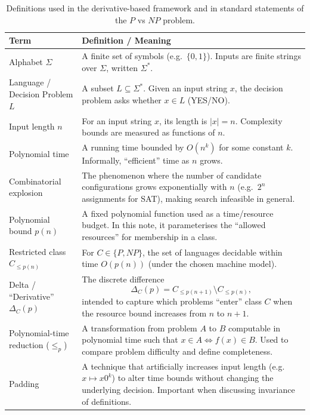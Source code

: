 \documentclass{article}
\begin{document}
\begin{table}[H]
\centering
\renewcommand{\arraystretch}{1.25}
\begin{tabularx}{\textwidth}{>{\raggedright\arraybackslash}p{} X}
\hline
\textbf{Term} & \textbf{Definition / Meaning} \\
\hline
Alphabet $\Sigma$ & A finite set of symbols (e.g.\ $\{0,1\}$). Inputs are finite strings over $\Sigma$, written $\Sigma^\ast$. \\
\hline
Language / Decision Problem $L$ & A subset $L \subseteq \Sigma^\ast$. Given an input string $x$, the decision problem asks whether $x \in L$ (YES/NO). \\
\hline
Input length $n$ & For an input string $x$, its length is $|x|=n$. Complexity bounds are measured as functions of $n$. \\
\hline
Polynomial time & A running time bounded by $O(n^k)$ for some constant $k$. Informally, ``efficient'' time as $n$ grows. \\
\hline
Combinatorial explosion & The phenomenon where the number of candidate configurations grows exponentially with $n$ (e.g.\ $2^n$ assignments for SAT), making search infeasible in general. \\
\hline
Polynomial bound $p(n)$ & A fixed polynomial function used as a time/resource budget. In this note, it parameterises the ``allowed resources'' for membership in a class. \\
\hline
Restricted class $C_{\le p(n)}$ & For $C \in \{P,NP\}$, the set of languages decidable within time $O(p(n))$ (under the chosen machine model). \\
\hline
Delta / ``Derivative'' $\Delta_C(p)$ & The discrete difference
\[
\Delta_C(p) = C_{\le p(n+1)} \setminus C_{\le p(n)},
\]
intended to capture which problems ``enter'' class $C$ when the resource bound increases from $n$ to $n\!+\!1$. \\
\hline
Polynomial-time reduction ($\le_p$) & A transformation from problem $A$ to $B$ computable in polynomial time such that $x\in A \Leftrightarrow f(x)\in B$. Used to compare problem difficulty and define completeness. \\
\hline
Padding & A technique that artificially increases input length (e.g.\ $x \mapsto x0^k$) to alter time bounds without changing the underlying decision. Important when discussing invariance of definitions. \\
\hline
\end{tabularx}
\caption{Definitions used in the derivative-based framework and in standard statements of the $P$ vs $NP$ problem.}
\end{table}
\end{document}

